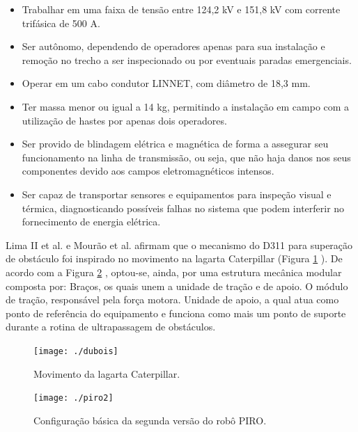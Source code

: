 \begin{itemize}
	\item Trabalhar em uma faixa de tensão entre 124,2 kV e 151,8 kV com corrente trifásica de 500 A.
	\item Ser autônomo, dependendo de operadores apenas para sua instalação e remoção no trecho a ser inspecionado ou por eventuais paradas emergenciais.
	\item Operar em um cabo condutor LINNET, com diâmetro de 18,3 mm.
	\item Ter massa menor ou igual a 14 kg, permitindo a instalação em campo com a utilização de hastes por apenas dois operadores. 
	\item Ser provido de blindagem elétrica e magnética de forma a assegurar seu funcionamento na linha de transmissão, ou seja, que não haja danos nos seus componentes devido aos campos eletromagnéticos intensos.
	\item Ser capaz de transportar sensores e equipamentos para inspeção visual e térmica, diagnosticando possíveis falhas no sistema que podem interferir no fornecimento de energia elétrica.
\end{itemize}

Lima II et al. \cite{iirobo} e Mourão et al. \cite{mourao2015robolinhas} afirmam que o mecanismo do D311 para superação de obstáculo foi inspirado no movimento na lagarta Caterpillar (Figura \ref{img:dubois} ). De acordo com a Figura \ref{img:piro2} , optou-se, ainda, por uma estrutura mecânica modular composta por: Braços, os quais unem a unidade de tração e de apoio. O módulo de tração, responsável pela força motora. Unidade de apoio, a qual atua como ponto de referência do equipamento e funciona como mais um ponto de suporte durante a rotina de ultrapassagem de obstáculos. 

\begin{figure} [h!]	
	\caption{Movimento da lagarta Caterpillar.}
	\label{img:dubois}											 
	\centering													 
	\texttt{[image: ./dubois]}
\end{figure}													 

\begin{figure} [h!]	
	\caption{Configuração básica da segunda versão do robô PIRO.}
	\label{img:piro2}											 
	\centering													 
	\texttt{[image: ./piro2]}
\end{figure}													 

